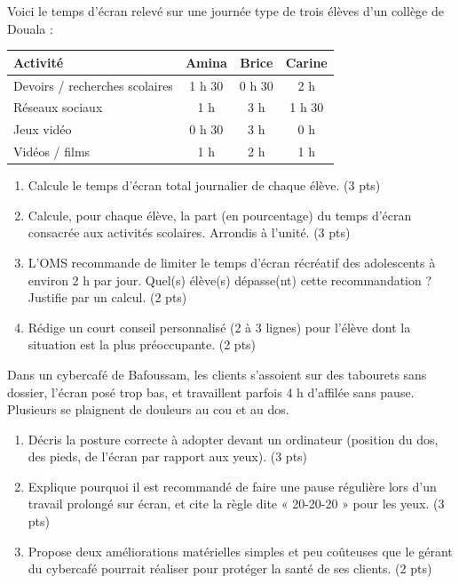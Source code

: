 \documentclass[11pt]{article}
\begin{document}
\begin{exercice}
Voici le temps d'écran relevé sur une journée type de trois élèves d'un collège de Douala :

\begin{center}
\begin{tabular}{|l|c|c|c|}
\hline
\textbf{Activité} & \textbf{Amina} & \textbf{Brice} & \textbf{Carine} \\
\hline
Devoirs / recherches scolaires & 1 h 30 & 0 h 30 & 2 h \\
\hline
Réseaux sociaux & 1 h & 3 h & 1 h 30 \\
\hline
Jeux vidéo & 0 h 30 & 3 h & 0 h \\
\hline
Vidéos / films & 1 h & 2 h & 1 h \\
\hline
\end{tabular}
\end{center}

\begin{enumerate}
\item Calcule le temps d'écran total journalier de chaque élève. (3 pts)
\item Calcule, pour chaque élève, la part (en pourcentage) du temps d'écran consacrée aux activités scolaires. Arrondis à l'unité. (3 pts)
\item L'OMS recommande de limiter le temps d'écran récréatif des adolescents à environ 2 h par jour. Quel(s) élève(s) dépasse(nt) cette recommandation ? Justifie par un calcul. (2 pts)
\item Rédige un court conseil personnalisé (2 à 3 lignes) pour l'élève dont la situation est la plus préoccupante. (2 pts)
\end{enumerate}
\end{exercice}

\begin{exercice}
Dans un cybercafé de Bafoussam, les clients s'assoient sur des tabourets sans dossier, l'écran posé trop bas, et travaillent parfois 4 h d'affilée sans pause. Plusieurs se plaignent de douleurs au cou et au dos.
\begin{enumerate}
\item Décris la posture correcte à adopter devant un ordinateur (position du dos, des pieds, de l'écran par rapport aux yeux). (3 pts)
\item Explique pourquoi il est recommandé de faire une pause régulière lors d'un travail prolongé sur écran, et cite la règle dite « 20-20-20 » pour les yeux. (3 pts)
\item Propose deux améliorations matérielles simples et peu coûteuses que le gérant du cybercafé pourrait réaliser pour protéger la santé de ses clients. (2 pts)
\end{enumerate}
\end{exercice}
\end{document}
